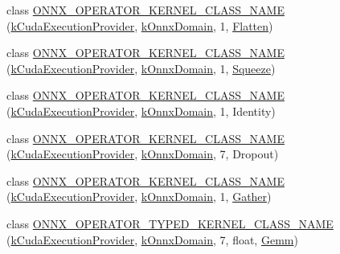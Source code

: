 \begin{DoxyCompactItemize}
\item 
class \mbox{\hyperlink{namespaceonnxruntime_1_1cuda_a20ece7ad2c7afb4c8386e70998a43e37}{O\+N\+N\+X\+\_\+\+O\+P\+E\+R\+A\+T\+O\+R\+\_\+\+K\+E\+R\+N\+E\+L\+\_\+\+C\+L\+A\+S\+S\+\_\+\+N\+A\+ME}} (\mbox{\hyperlink{namespaceonnxruntime_a73ebc64887ddd1968e3cef47ffefe35b}{k\+Cuda\+Execution\+Provider}}, \mbox{\hyperlink{namespaceonnxruntime_ac0e7c0c106a2c9e9594560a3ab289fa0}{k\+Onnx\+Domain}}, 1, \mbox{\hyperlink{classonnxruntime_1_1cuda_1_1Flatten}{Flatten}})
\item 
class \mbox{\hyperlink{namespaceonnxruntime_1_1cuda_a33e9b0edd7ea96ac7c2529cd3f1aef4b}{O\+N\+N\+X\+\_\+\+O\+P\+E\+R\+A\+T\+O\+R\+\_\+\+K\+E\+R\+N\+E\+L\+\_\+\+C\+L\+A\+S\+S\+\_\+\+N\+A\+ME}} (\mbox{\hyperlink{namespaceonnxruntime_a73ebc64887ddd1968e3cef47ffefe35b}{k\+Cuda\+Execution\+Provider}}, \mbox{\hyperlink{namespaceonnxruntime_ac0e7c0c106a2c9e9594560a3ab289fa0}{k\+Onnx\+Domain}}, 1, \mbox{\hyperlink{classonnxruntime_1_1cuda_1_1Squeeze}{Squeeze}})
\item 
class \mbox{\hyperlink{namespaceonnxruntime_1_1cuda_a3f5e457c38589d021753cbf119f9be57}{O\+N\+N\+X\+\_\+\+O\+P\+E\+R\+A\+T\+O\+R\+\_\+\+K\+E\+R\+N\+E\+L\+\_\+\+C\+L\+A\+S\+S\+\_\+\+N\+A\+ME}} (\mbox{\hyperlink{namespaceonnxruntime_a73ebc64887ddd1968e3cef47ffefe35b}{k\+Cuda\+Execution\+Provider}}, \mbox{\hyperlink{namespaceonnxruntime_ac0e7c0c106a2c9e9594560a3ab289fa0}{k\+Onnx\+Domain}}, 1, Identity)
\item 
class \mbox{\hyperlink{namespaceonnxruntime_1_1cuda_aeb48b28a51c722eb5ed11973e7c2a87f}{O\+N\+N\+X\+\_\+\+O\+P\+E\+R\+A\+T\+O\+R\+\_\+\+K\+E\+R\+N\+E\+L\+\_\+\+C\+L\+A\+S\+S\+\_\+\+N\+A\+ME}} (\mbox{\hyperlink{namespaceonnxruntime_a73ebc64887ddd1968e3cef47ffefe35b}{k\+Cuda\+Execution\+Provider}}, \mbox{\hyperlink{namespaceonnxruntime_ac0e7c0c106a2c9e9594560a3ab289fa0}{k\+Onnx\+Domain}}, 7, Dropout)
\item 
class \mbox{\hyperlink{namespaceonnxruntime_1_1cuda_ae38a7e95bfca39ecba992b9f916bc2f2}{O\+N\+N\+X\+\_\+\+O\+P\+E\+R\+A\+T\+O\+R\+\_\+\+K\+E\+R\+N\+E\+L\+\_\+\+C\+L\+A\+S\+S\+\_\+\+N\+A\+ME}} (\mbox{\hyperlink{namespaceonnxruntime_a73ebc64887ddd1968e3cef47ffefe35b}{k\+Cuda\+Execution\+Provider}}, \mbox{\hyperlink{namespaceonnxruntime_ac0e7c0c106a2c9e9594560a3ab289fa0}{k\+Onnx\+Domain}}, 1, \mbox{\hyperlink{classonnxruntime_1_1cuda_1_1Gather}{Gather}})
\item 
class \mbox{\hyperlink{namespaceonnxruntime_1_1cuda_a9f842c869d8ebfce66edc4f0c9c84c97}{O\+N\+N\+X\+\_\+\+O\+P\+E\+R\+A\+T\+O\+R\+\_\+\+T\+Y\+P\+E\+D\+\_\+\+K\+E\+R\+N\+E\+L\+\_\+\+C\+L\+A\+S\+S\+\_\+\+N\+A\+ME}} (\mbox{\hyperlink{namespaceonnxruntime_a73ebc64887ddd1968e3cef47ffefe35b}{k\+Cuda\+Execution\+Provider}}, \mbox{\hyperlink{namespaceonnxruntime_ac0e7c0c106a2c9e9594560a3ab289fa0}{k\+Onnx\+Domain}}, 7, float, \mbox{\hyperlink{classonnxruntime_1_1cuda_1_1Gemm}{Gemm}})

\end{DoxyCompactItemize}
